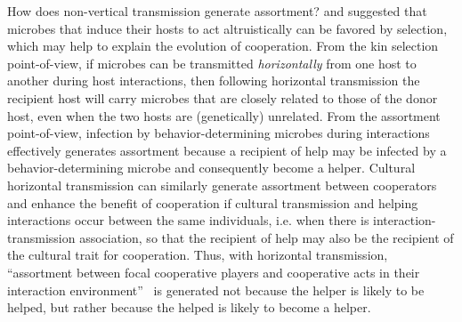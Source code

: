\documentclass[12pt]{extarticle}
\newcommand{\beginsupplement}{%
      	\setcounter{table}{0}
        \renewcommand{\thetable}{S\arabic{table}}%
        \setcounter{figure}{0}
        \renewcommand{\thefigure}{S\arabic{figure}}%
		\setcounter{equation}{0}
        \renewcommand{\theequation}{A\arabic{equation}}%
}
\begin{document}
How does non-vertical transmission generate assortment? 
\citet{lewin2017microbes} and \citet{lewin2020rockpaperscissors} 
suggested that microbes that induce their hosts to act altruistically can be favored by selection, which may help to explain the evolution of cooperation. 
From the kin selection point-of-view, if microbes can be transmitted \emph{horizontally} from one host to another during host interactions, then following horizontal transmission the recipient host will carry microbes that are closely related to those of the donor host, 
even when the two hosts are (genetically) unrelated. 
From the assortment point-of-view,
infection by behavior-determining microbes during interactions effectively generates assortment because a recipient of help may be infected by a behavior-determining microbe and consequently become a helper.
Cultural horizontal transmission can similarly generate assortment between cooperators and enhance the benefit of cooperation if cultural transmission and helping interactions occur between the same individuals, i.e. when there is interaction-transmission association, so that the recipient of help may also be the recipient of the cultural trait for cooperation. 
Thus, with horizontal transmission, ``assortment between focal cooperative players and cooperative acts in their interaction
environment''~\citep{Fletcher2009assortment} is generated not because the helper is likely to be helped, but rather because the helped is likely to become a helper.


\newpage







\newpage
\beginsupplement %
\end{document}
